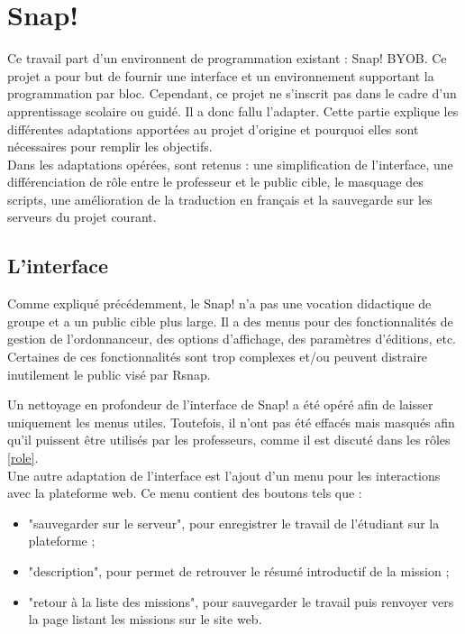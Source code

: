 \section{Snap!}
\label{solution SNAP}
Ce travail part d'un environnent de programmation existant : Snap! BYOB. Ce projet a pour but de fournir une interface et un environnement supportant la programmation par bloc. Cependant, ce projet ne s'inscrit pas dans le cadre d'un apprentissage scolaire ou guidé. Il a donc fallu l'adapter. Cette partie explique les différentes adaptations apportées au projet d'origine et pourquoi elles sont nécessaires pour remplir les objectifs.\\

Dans les adaptations opérées, sont retenus : une simplification de l'interface, une différenciation de rôle entre le professeur et le public cible, le masquage des scripts, une amélioration de la traduction en français et la sauvegarde sur les serveurs du projet courant.

\subsection{L'interface}
\label{interface}
Comme expliqué précédemment, le Snap! n'a pas une vocation didactique de groupe et a un public cible plus large. Il a des menus pour des fonctionnalités de gestion de l'ordonnanceur, des options d'affichage, des paramètres d'éditions, etc. Certaines de ces fonctionnalités sont trop complexes et/ou peuvent distraire inutilement le public visé par Rsnap.

Un nettoyage en profondeur de l'interface de Snap! a été opéré afin de laisser uniquement les menus utiles. Toutefois, il n'ont pas été effacés mais masqués afin qu'il puissent être utilisés par les professeurs, comme il est discuté dans les rôles \ref{role}.\\

Une autre adaptation de l'interface est l'ajout d'un menu pour les interactions avec la plateforme web. Ce menu contient des boutons tels que : 
\begin{itemize}
  \item "sauvegarder sur le serveur", pour enregistrer le travail de l'étudiant sur la plateforme ; 
  \item "description", pour permet de retrouver le résumé introductif de la mission ; 
  \item "retour à la liste des missions", pour sauvegarder le travail puis renvoyer vers la page listant les missions sur le site web.
\end{itemize}

